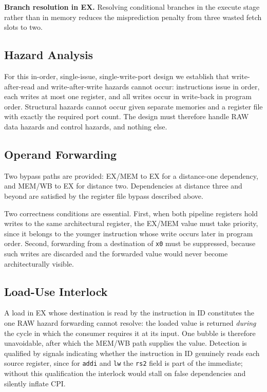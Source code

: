 \documentclass[conference]{IEEEtran}
\begin{document}
\textbf{Branch resolution in EX.} Resolving conditional branches in the
execute stage rather than in memory reduces the misprediction penalty from
three wasted fetch slots to two.

\subsection{Hazard Analysis}

For this in-order, single-issue, single-write-port design we establish that
write-after-read and write-after-write hazards cannot occur: instructions
issue in order, each writes at most one register, and all writes occur in
write-back in program order. Structural hazards cannot occur given separate
memories and a register file with exactly the required port count. The
design must therefore handle RAW data hazards and control hazards, and
nothing else.

\subsection{Operand Forwarding}

Two bypass paths are provided: EX/MEM to EX for a distance-one dependency,
and MEM/WB to EX for distance two. Dependencies at distance three and
beyond are satisfied by the register file bypass described above.

Two correctness conditions are essential. First, when both pipeline
registers hold writes to the same architectural register, the EX/MEM value
must take priority, since it belongs to the younger instruction whose write
occurs later in program order. Second, forwarding from a destination of
\texttt{x0} must be suppressed, because such writes are discarded and the
forwarded value would never become architecturally visible.

\subsection{Load-Use Interlock}

A load in EX whose destination is read by the instruction in ID constitutes
the one RAW hazard forwarding cannot resolve: the loaded value is returned
\emph{during} the cycle in which the consumer requires it at its input. One
bubble is therefore unavoidable, after which the MEM/WB path supplies the
value. Detection is qualified by signals indicating whether the instruction
in ID genuinely reads each source register, since for \texttt{addi} and
\texttt{lw} the \texttt{rs2} field is part of the immediate; without this
qualification the interlock would stall on false dependencies and silently
inflate CPI.
\end{document}
